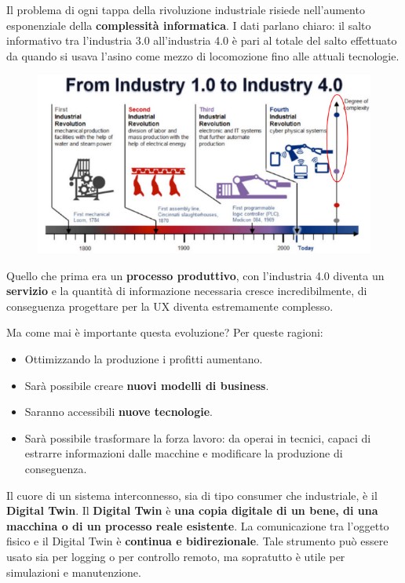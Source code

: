 \documentclass[a4paper,11pt,oneside]{book}
\begin{document}
\pagebreak

Il problema di ogni tappa della rivoluzione industriale risiede nell'aumento esponenziale della \textbf{complessità informatica}. I dati parlano chiaro: il salto informativo tra l'industria 3.0 all'industria 4.0 è pari al totale del salto effettuato da quando si usava l'asino come mezzo di locomozione fino alle attuali tecnologie.

\begin{figure}[!h]
	\centering
	\includegraphics[scale=0.6]{immagini/Revolution.png}
\end{figure}

Quello che prima era un \textbf{processo produttivo}, con l'industria 4.0 diventa un \textbf{servizio} e la quantità di informazione necessaria cresce incredibilmente, di conseguenza progettare per la UX diventa estremamente complesso.

Ma come mai è importante questa evoluzione? Per queste ragioni:

\begin{itemize}
	\item  Ottimizzando la produzione i profitti aumentano.
	\item Sarà possibile creare \textbf{nuovi modelli di business}.
	\item Saranno accessibili \textbf{nuove tecnologie}.
	\item Sarà possibile trasformare la forza lavoro: da operai in tecnici, capaci di estrarre informazioni dalle macchine e modificare la produzione di conseguenza.
\end{itemize}

Il cuore di un sistema interconnesso, sia di tipo consumer che industriale, è il
\textbf{Digital Twin}. Il \textbf{Digital Twin} è  \textbf{una copia digitale di un bene, di una macchina o di un processo reale esistente}. La comunicazione tra l'oggetto fisico e il Digital Twin è \textbf{continua e bidirezionale}. Tale strumento può essere usato sia per logging o per controllo remoto, ma sopratutto è utile per simulazioni e manutenzione.
\end{document}
